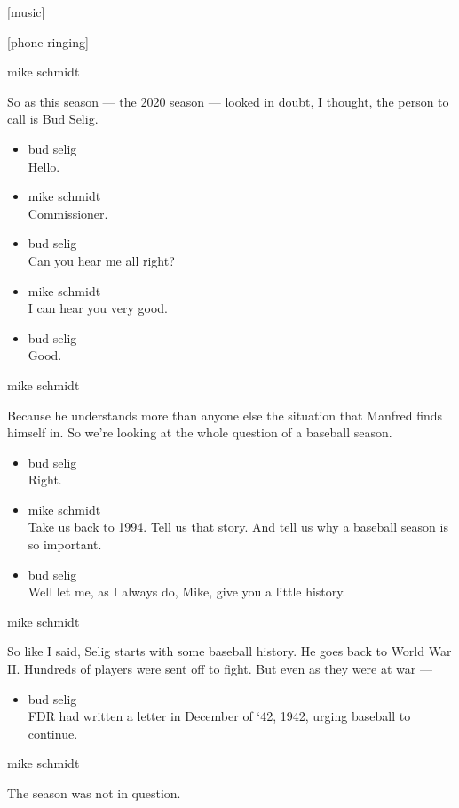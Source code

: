 {[}music{]}

{[}phone ringing{]}

mike schmidt

So as this season --- the 2020 season --- looked in doubt, I thought,
the person to call is Bud Selig.

\begin{itemize}
\item
  bud selig\\
  Hello.
\item
  mike schmidt\\
  Commissioner.
\item
  bud selig\\
  Can you hear me all right?
\item
  mike schmidt\\
  I can hear you very good.
\item
  bud selig\\
  Good.
\end{itemize}

mike schmidt

Because he understands more than anyone else the situation that Manfred
finds himself in. So we're looking at the whole question of a baseball
season.

\begin{itemize}
\item
  bud selig\\
  Right.
\item
  mike schmidt\\
  Take us back to 1994. Tell us that story. And tell us why a baseball
  season is so important.
\item
  bud selig\\
  Well let me, as I always do, Mike, give you a little history.
\end{itemize}

mike schmidt

So like I said, Selig starts with some baseball history. He goes back to
World War II. Hundreds of players were sent off to fight. But even as
they were at war ---

\begin{itemize}
\tightlist
\item
  bud selig\\
  FDR had written a letter in December of `42, 1942, urging baseball to
  continue.
\end{itemize}

mike schmidt

The season was not in question.

